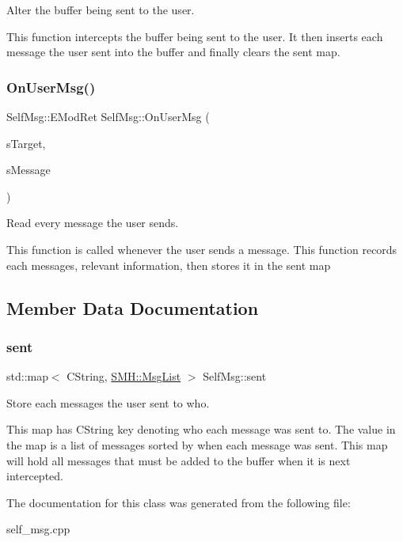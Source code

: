 Alter the buffer being sent to the user. 

This function intercepts the buffer being sent to the user. It then inserts each message the user sent into the buffer and finally clears the \textquotesingle{}sent\textquotesingle{} map. \mbox{\label{class_self_msg_ae86a578c56e20230f89d776e02b089d5}} 
\subsubsection{\texorpdfstring{On\+User\+Msg()}{OnUserMsg()}}
{\footnotesize\ttfamily Self\+Msg\+::\+E\+Mod\+Ret Self\+Msg\+::\+On\+User\+Msg (\begin{DoxyParamCaption}\item[{C\+String \&}]{s\+Target,  }\item[{C\+String \&}]{s\+Message }\end{DoxyParamCaption})\hspace{0.3cm}{\ttfamily [override]}}



Read every message the user sends. 

This function is called whenever the user sends a message. This function records each messages, relevant information, then stores it in the \textquotesingle{}sent\textquotesingle{} map 

\subsection{Member Data Documentation}
\mbox{\label{class_self_msg_ae2dc542caa1a3f5ae45e6de96d37cb22}} 
\subsubsection{\texorpdfstring{sent}{sent}}
{\footnotesize\ttfamily std\+::map$<$ C\+String, \hyperlink{namespace_s_m_h_a577a58a147f501590720badab28c2c98}{S\+M\+H\+::\+Msg\+List} $>$ Self\+Msg\+::sent\hspace{0.3cm}{\ttfamily [protected]}}



Store each messages the user sent to who. 

This map has C\+String key denoting who each message was sent to. The value in the map is a list of messages sorted by when each message was sent. This map will hold all messages that must be added to the buffer when it is next intercepted. 

The documentation for this class was generated from the following file\+:\begin{DoxyCompactItemize}
\item 
self\+\_\+msg.\+cpp\end{DoxyCompactItemize}
